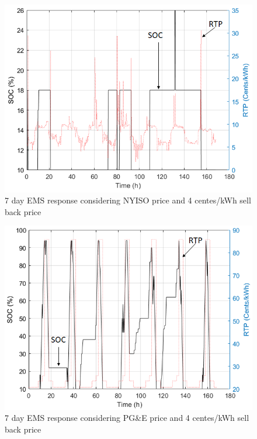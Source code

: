  \begin{figure}[!ht]
    \centering
    \includegraphics[width = \linewidth]{figs/VAR_10_12_4.png}
    \caption{7 day EMS response considering NYISO price and 4 centes/kWh sell back price}
    \label{fig:VAR_10_12_4}
\end{figure}


 \begin{figure}[!ht]
    \centering
    \includegraphics[width = \linewidth]{figs/PG_VAR_10_12_4.png}
    \caption{7 day EMS response considering PG\&E price and 4 centes/kWh sell back price}
    \label{fig:PG_VAR_10_12_4}
\end{figure}

